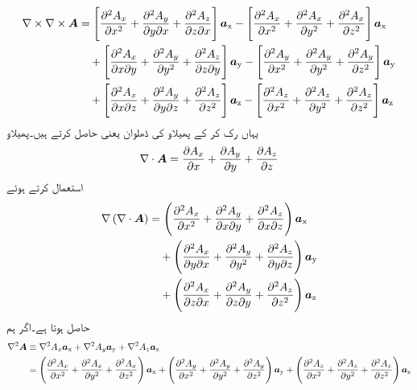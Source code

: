 \begin{gather}
\begin{aligned}\label{مساوات_مقناطیسی_گردش_کی_گردش_الف}
\nabla \times \nabla \times {\ensuremath{{\boldsymbol{A}}}}&=\left[\frac{\partial^2 A_x}{\partial x^2}+\frac{\partial^2 A_y}{\partial y\partial x}+\frac{\partial^2 A_z}{\partial z\partial x}\right]{\boldsymbol{a}}_{\textup{x}}-\left[\frac{\partial^2 A_x}{\partial x^2}+\frac{\partial^2 A_x}{\partial y^2} +\frac{\partial^2 A_x}{\partial z^2} \right]{\boldsymbol{a}}_{\textup{x}}\\
& \quad +\left[\frac{\partial^2 A_x}{\partial x\partial y}+\frac{\partial^2 A_y}{\partial y^2}+ \frac{\partial^2 A_z}{\partial z\partial y}\right]{\boldsymbol{a}}_{\textup{y}}-\left[\frac{\partial^2 A_y}{\partial x^2}+\frac{\partial^2 A_y}{\partial y^2}+\frac{\partial^2 A_y}{\partial z^2} \right]{\boldsymbol{a}}_{\textup{y}}\\
&\quad +\left[ \frac{\partial^2 A_x}{\partial x\partial z}+\frac{\partial^2 A_y}{\partial y\partial z}+\frac{\partial^2 A_z}{\partial z^2}\right]{\boldsymbol{a}}_{\textup{z}}-\left[\frac{\partial^2 A_z}{\partial x^2}+\frac{\partial^2 A_z}{\partial y^2}+ \frac{\partial^2 A_z}{\partial z^2} \right]{\boldsymbol{a}}_{\textup{z}}
\end{aligned}
\end{gather}
یہاں رک کر  کے پھیلاو کی ڈھلوان یعنی  حاصل کرتے ہیں۔پھیلاو
\begin{align*}
\nabla \cdot {\ensuremath{{\boldsymbol{A}}}}=\frac{\partial A_x}{\partial x}+\frac{\partial A_y}{\partial y}+\frac{\partial A_z}{\partial z}
\end{align*}
استعمال کرتے ہوئے
\begin{gather}
\begin{aligned}
\nabla \left(\nabla \cdot {\ensuremath{{\boldsymbol{A}}}} \right)&=\left(\frac{\partial^2 A_x}{\partial x^2}+\frac{\partial^2 A_y}{\partial x  \partial y}+\frac{\partial^2 A_z}{\partial x  \partial z} \right){\boldsymbol{a}}_{\textup{x}}\\
&\quad +\left(\frac{\partial^2 A_x}{\partial y \partial x}+\frac{\partial^2 A_y}{\partial y^2}+\frac{\partial^2 A_z}{\partial y  \partial z} \right){\boldsymbol{a}}_{\textup{y}}\\
&\quad +\left(\frac{\partial^2 A_x}{\partial z \partial x}+\frac{\partial^2 A_y}{\partial z\partial y}+\frac{\partial^2 A_z}{\partial z^2} \right){\boldsymbol{a}}_{\textup{z}}\\
\end{aligned}
\end{gather}
حاصل ہوتا ہے۔اگر ہم
\begin{gather}
\begin{aligned}\label{مساوات_مقناطیسی_سمتی_لاپلاسی}
\nabla^2 {{\boldsymbol{A}}} &\equiv \nabla^2 A_x {\boldsymbol{a}}_{\textup{x}}+\nabla^2 A_y {\boldsymbol{a}}_{\textup{y}}+\nabla^2 A_z {\boldsymbol{a}}_{\textup{z}}\\
&=\left(\frac{\partial^2 A_x}{\partial x^2}+\frac{\partial^2 A_x}{\partial y^2}+\frac{\partial^2 A_x}{\partial z^2} \right){\boldsymbol{a}}_{\textup{x}}+\left(\frac{\partial^2 A_y}{\partial x^2}+\frac{\partial^2 A_y}{\partial y^2}+\frac{\partial^2 A_y}{\partial z^2} \right){\boldsymbol{a}}_{\textup{y}}+\left(\frac{\partial^2 A_z}{\partial x^2}+\frac{\partial^2 A_z}{\partial y^2}+\frac{\partial^2 A_z}{\partial z^2} \right){\boldsymbol{a}}_{\textup{z}}
\end{aligned}
\end{gather}
